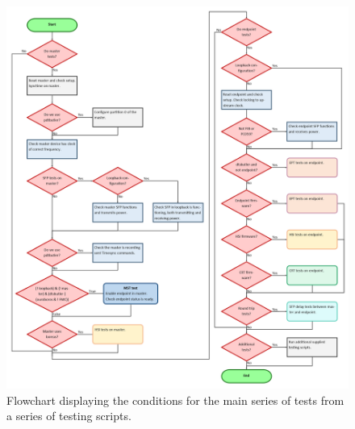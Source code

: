 \documentclass{dune}
\begin{document}

\begin{figure}[hb!]
\begin{center}
\includegraphics[width=\linewidth]{figures/flowchart-fdr-main.png}
\caption{Flowchart displaying the conditions for the main series of tests from a series of testing scripts.}
\label{fig:flowchart-main}
\end{center}
\end{figure}
\FloatBarrier
\end{document}
